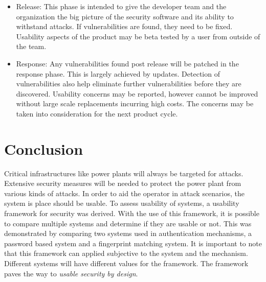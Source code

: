 \begin{itemize}
\item Release: This phase is intended to give the developer team and the organization the big picture of the security software and its ability to withstand attacks. If vulnerabilities are found, they need to be fixed. Usability aspects of the product may be beta tested by a user from outside of the team.

\item Response: Any vulnerabilities found post release will be patched in the response phase. This is largely achieved by updates. Detection of vulnerabilities also help eliminate further vulnerabilities before they are discovered. Usability concerns may be reported, however cannot be improved without large scale replacements incurring high costs. The concerns may be taken into consideration for the next product cycle.
\end{itemize} 

\section{Conclusion}
Critical infrastructures like power plants will always be targeted for attacks. Extensive security measures will be needed to protect the power plant from various kinds of attacks. In order to aid the operator in attack scenarios, the system is place should be usable. To assess usability of systems, a usability framework for security was derived. With the use of this framework, it is possible to compare multiple systems and determine if they are usable or not. This was demonstrated by comparing two systems used in authentication mechanisms, a password based system and a fingerprint matching system. It is important to note that this framework can applied subjective to the system and the mechanism. Different systems will have different values for the framework. The framework paves the way to \textit{usable security by design}. 

